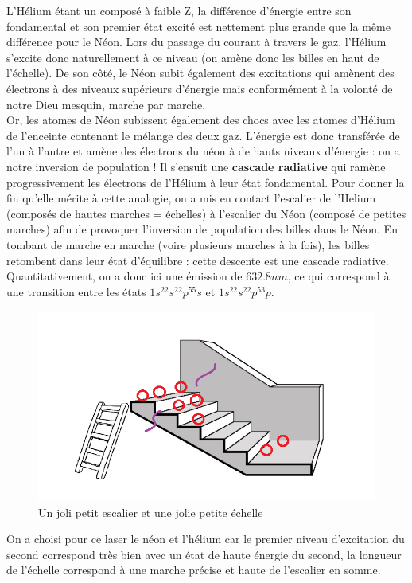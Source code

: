 L'Hélium étant un composé à faible Z, la différence d'énergie entre son fondamental et son premier état excité est nettement plus grande que la même différence pour le Néon. Lors du passage du courant à travers le gaz, l'Hélium s'excite donc naturellement à ce niveau (on amène donc les billes en haut de l'échelle). De son côté, le Néon subit également des excitations qui amènent des électrons à des niveaux supérieurs d'énergie mais conformément à la volonté de notre Dieu mesquin, marche par marche.\\ 
Or, les atomes de Néon subissent également des chocs avec les atomes d'Hélium de l'enceinte contenant le mélange des deux gaz. L'énergie est donc transférée de l'un à l'autre et amène des électrons du néon à de hauts niveaux d'énergie : on a notre inversion de population ! Il s'ensuit une \textbf{cascade radiative} qui ramène progressivement les électrons de l'Hélium à leur état fondamental. Pour donner la fin qu'elle mérite à cette analogie, on a mis en contact l'escalier de l'Helium (composés de hautes marches = échelles) à l'escalier du Néon (composé de petites marches) afin de provoquer l'inversion de population des billes dans le Néon. En tombant de marche en marche (voire plusieurs marches à la fois), les billes retombent dans leur état d'équilibre : cette descente est une cascade radiative.\\
Quantitativement, on a donc ici une émission de $632.8nm$, ce qui correspond à une transition entre les états $1s^22s^22p^55s$ et $1s^22s^22p^53p$.\\
\begin{figure}[tph]
    \centering
    \includegraphics[scale=1.0]{Images2/Escalier 1.png}
    \caption{Un joli petit escalier et une jolie petite échelle}
    \label{fig:Analogie}
\end{figure}
On a choisi pour ce laser le néon et l'hélium car le premier niveau d'excitation du second correspond très bien avec un état de haute énergie du second, la longueur de l'échelle correspond à une marche précise et haute de l'escalier en somme.\\
